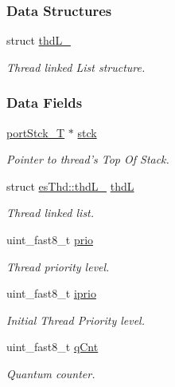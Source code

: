 \subsubsection*{Data Structures}
\begin{DoxyCompactItemize}
\item 
struct \hyperlink{structesThd_1_1thdL__}{thd\-L\-\_\-}
\begin{DoxyCompactList}\small\item\em Thread linked List structure. \end{DoxyCompactList}\end{DoxyCompactItemize}
\subsubsection*{Data Fields}
\begin{DoxyCompactItemize}
\item 
\hyperlink{group__template__cpu__intf_ga13cc91970e3e05fe4210440c068d3f4a}{port\-Stck\-\_\-\-T} $\ast$ \hyperlink{structesThd_a5a7906c650bc81f3f0639f6f8565316b}{stck}
\begin{DoxyCompactList}\small\item\em Pointer to thread's Top Of Stack. \end{DoxyCompactList}\item 
struct \hyperlink{structesThd_1_1thdL__}{es\-Thd\-::thd\-L\-\_\-} \hyperlink{structesThd_a69f72ac3b1f6199da48b41804f353325}{thd\-L}
\begin{DoxyCompactList}\small\item\em Thread linked list. \end{DoxyCompactList}\item 
uint\-\_\-fast8\-\_\-t \hyperlink{structesThd_a8d1877cabc7d4e637f96f4b4d5b0da09}{prio}
\begin{DoxyCompactList}\small\item\em Thread priority level. \end{DoxyCompactList}\item 
uint\-\_\-fast8\-\_\-t \hyperlink{structesThd_ad21505b1a302ea26fd073f7f67da3e84}{iprio}
\begin{DoxyCompactList}\small\item\em Initial Thread Priority level. \end{DoxyCompactList}\item 
uint\-\_\-fast8\-\_\-t \hyperlink{structesThd_a5721e76b02321c6701e52a9788d9bf1e}{q\-Cnt}
\begin{DoxyCompactList}\small\item\em Quantum counter. \end{DoxyCompactList}\item 

\end{DoxyCompactItemize}
